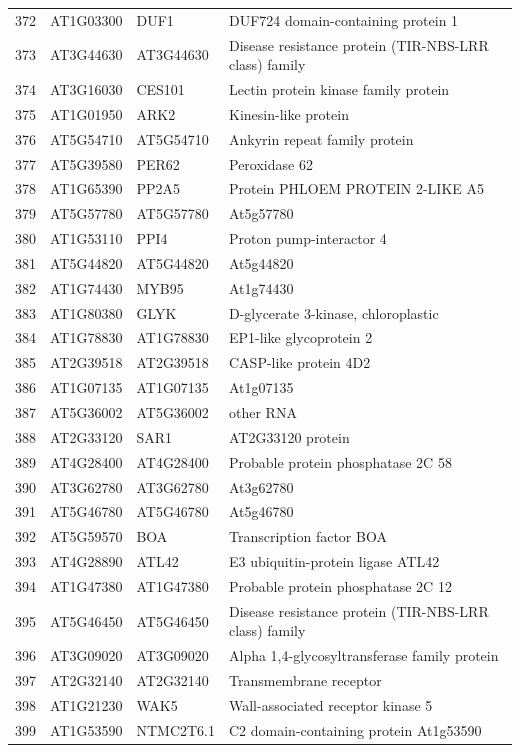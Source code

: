 \documentclass[11pt]{article}
\begin{document}
\begin{center}
\begin{tabular}{rlll}
372 & AT1G03300 & DUF1 & DUF724 domain-containing protein 1\\
373 & AT3G44630 & AT3G44630 & Disease resistance protein (TIR-NBS-LRR class) family\\
374 & AT3G16030 & CES101 & Lectin protein kinase family protein\\
375 & AT1G01950 & ARK2 & Kinesin-like protein\\
376 & AT5G54710 & AT5G54710 & Ankyrin repeat family protein\\
377 & AT5G39580 & PER62 & Peroxidase 62\\
378 & AT1G65390 & PP2A5 & Protein PHLOEM PROTEIN 2-LIKE A5\\
379 & AT5G57780 & AT5G57780 & At5g57780\\
380 & AT1G53110 & PPI4 & Proton pump-interactor 4\\
381 & AT5G44820 & AT5G44820 & At5g44820\\
382 & AT1G74430 & MYB95 & At1g74430\\
383 & AT1G80380 & GLYK & D-glycerate 3-kinase, chloroplastic\\
384 & AT1G78830 & AT1G78830 & EP1-like glycoprotein 2\\
385 & AT2G39518 & AT2G39518 & CASP-like protein 4D2\\
386 & AT1G07135 & AT1G07135 & At1g07135\\
387 & AT5G36002 & AT5G36002 & other RNA\\
388 & AT2G33120 & SAR1 & AT2G33120 protein\\
389 & AT4G28400 & AT4G28400 & Probable protein phosphatase 2C 58\\
390 & AT3G62780 & AT3G62780 & At3g62780\\
391 & AT5G46780 & AT5G46780 & At5g46780\\
392 & AT5G59570 & BOA & Transcription factor BOA\\
393 & AT4G28890 & ATL42 & E3 ubiquitin-protein ligase ATL42\\
394 & AT1G47380 & AT1G47380 & Probable protein phosphatase 2C 12\\
395 & AT5G46450 & AT5G46450 & Disease resistance protein (TIR-NBS-LRR class) family\\
396 & AT3G09020 & AT3G09020 & Alpha 1,4-glycosyltransferase family protein\\
397 & AT2G32140 & AT2G32140 & Transmembrane receptor\\
398 & AT1G21230 & WAK5 & Wall-associated receptor kinase 5\\
399 & AT1G53590 & NTMC2T6.1 & C2 domain-containing protein At1g53590\\

\end{tabular}
\end{center}
\end{document}
